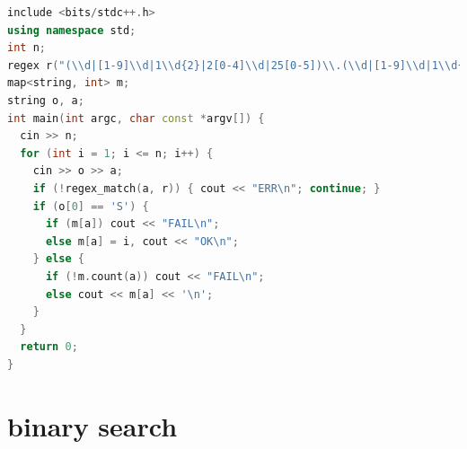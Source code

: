 \documentclass[12pt,twiside,a4paper]{ctexbook}
\numberwithin{chapter}{part}
\begin{document}
\begin{lstlisting}[language=c++,breaklines=true]
include <bits/stdc++.h>
using namespace std;
int n;
regex r("(\\d|[1-9]\\d|1\\d{2}|2[0-4]\\d|25[0-5])\\.(\\d|[1-9]\\d|1\\d{2}|2[0-4]\\d|25[0-5])\\.(\\d|[1-9]\\d|1\\d{2}|2[0-4]\\d|25[0-5])\\.(\\d|[1-9]\\d|1\\d{2}|2[0-4]\\d|25[0-5]):(\\d|[1-9]\\d{1,3}|[1-5]\\d{4}|6[0-4]\\d{3}|65[0-4]\\d{2}|655[0-2]\\d|6553[0-5])");
map<string, int> m;
string o, a;
int main(int argc, char const *argv[]) {
  cin >> n;
  for (int i = 1; i <= n; i++) {
    cin >> o >> a;
    if (!regex_match(a, r)) { cout << "ERR\n"; continue; }
    if (o[0] == 'S') {
      if (m[a]) cout << "FAIL\n";
      else m[a] = i, cout << "OK\n";
    } else {
      if (!m.count(a)) cout << "FAIL\n";
      else cout << m[a] << '\n';
    }
  }
  return 0;
}
\end{lstlisting}

\chapter{binary search}
\end{document}
